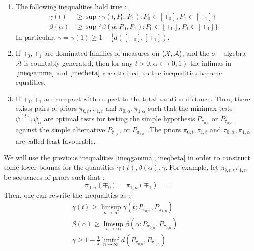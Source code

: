 \begin{theorem}\label{thm2.1}\citet[Theorem 2.1]{Ing2012}
    \leavevmode
    \begin{enumerate}
        \item The following inequalities hold true : 
        \begin{align}
            \gamma(t) &\geq \sup \bigl\{\gamma(t,P_0,P_1) : P_0 \in [\mp_0], P_1 \in [\mp_1] \bigr\} \label{ineqgamma}\\
            \beta(\alpha) &\geq \sup \bigl\{\beta(\alpha, P_0, P_1) : P_0 \in [\mp_0], P_1 \in [\mp_1]\bigr\} \label{ineqbeta}
        \end{align}
        In particular, $\gamma = \gamma(1) \geq 1-\frac{1}{2}d([\mp_0],[\mp_1])$.
        \item If $\mp_0,\mp_1$ are dominated families of measures on $(\mathcal{X},\mathcal{A})$, and the $\sigma-$algebra $\mathcal{A}$ is countably generated, then for any $t>0, \alpha \in \left(0,1\right)$ the infimas in $\ref{ineqgamma}$ and $\ref{ineqbeta}$ are attained, so the inequalities become equalities.
        \item If $\mp_0,\mp_1$ are compact with respect to the total varation distance. Then, there exists pairs of priors $\pi_{0,t},\pi_{1,t}$ and $\pi_{0,\alpha},\pi_{1,\alpha}$ such that the minimax tests $\psi^{(t)}, \psi_\alpha$ are optimal tests for testing the simple hypothesis $P_{\pi_{0,t}}$ or $P_{\pi_{0,\alpha}}$ against the simple alternative $P_{\pi_{1,t}}$, or $P_{\pi_{1,\alpha}}$. The priors $\pi_{0,t},\pi_{1,t}$ and $\pi_{0,\alpha},\pi_{1,\alpha}$ are called least favourable.
    \end{enumerate}
\end{theorem}
We will use the previous inequalities \ref{ineqgamma},\ref{ineqbeta} in order to construct some lower bounds for the quantities $\gamma(t), \beta(\alpha),\gamma$. For example, let $\pi_{0,n},\pi_{1,n}$ be sequences of priors such that : 
\begin{equation}\label{condpriors}
    \pi_{0,n}(\mp_0) = \pi_{1,n}(\mp_1) = 1
\end{equation}
Then, one can rewrite the inequalities as : 
\begin{align}
    \gamma(t) \geq \limsup_{n \rightarrow\infty} \gamma(t;P_{\pi_{0,n}},P_{\pi_{1,n}})& \label{limsupgamma} \\
    \beta(\alpha) \geq \limsup_{n\rightarrow \infty} \beta(\alpha; P_{\pi_{0,n}},P_{\pi_{1,n}})& \label{limsupbeta} \\ 
    \gamma \geq 1-\frac{1}{2}\liminf_{n\rightarrow \infty} d(P_{\pi_{0,n}},P_{\pi_{1,n}})& \label{limsupgamma1}
\end{align}
